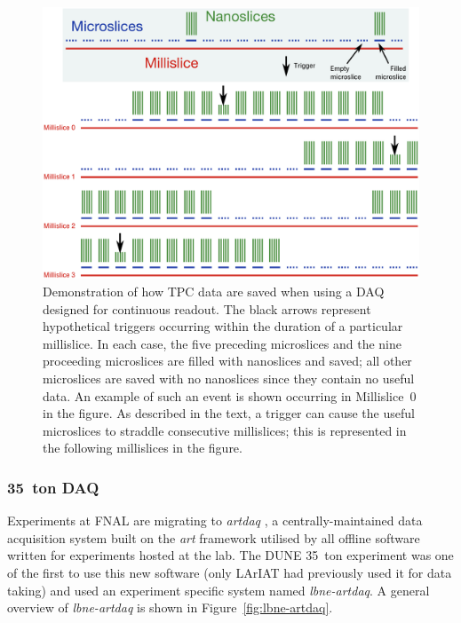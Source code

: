 \begin{figure}
  \centering
  \includegraphics[width=16cm]{triggered_event.eps}
  \caption[Demonstration of how TPC data from a triggered event in a LArTPC is saved when employing a DAQ with continuous readout.]{Demonstration of how TPC data are saved when using a DAQ designed for continuous readout.  The black arrows represent hypothetical triggers occurring within the duration of a particular millislice.  In each case, the five preceding microslices and the nine proceeding microslices are filled with nanoslices and saved; all other microslices are saved with no nanoslices since they contain no useful data.  An example of such an event is shown occurring in Millislice~0 in the figure.  As described in the text, a trigger can cause the useful microslices to straddle consecutive millislices; this is represented in the following millislices in the figure.}
  \label{fig:35tonTriggeredEvent}
\end{figure}

\subsubsection{35~ton DAQ}\label{sec:35tonDAQ}

Experiments at FNAL are migrating to \textit{artdaq} \cite{Biery2013}, a centrally-maintained data acquisition system built on the \textit{art} \cite{artWebsite,art2012} framework utilised by all offline software written for experiments hosted at the lab.  The DUNE 35~ton experiment was one of the first to use this new software (only LArIAT had previously used it for data taking) and used an experiment specific system named \textit{lbne-artdaq}.  A general overview of \textit{lbne-artdaq} is shown in Figure~\ref{fig:lbne-artdaq}.

